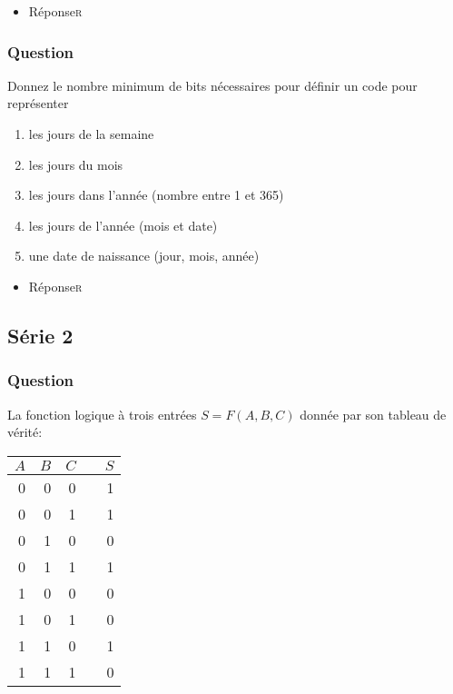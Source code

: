 \documentclass[11pt]{article}
\begin{document}
\begin{itemize}
\item Réponse\hfill{}\textsc{r}
\label{sec:orge75a3d5}
\end{itemize}

\subsubsection*{Question}
\label{sec:org6382b1a}
Donnez le nombre minimum de bits nécessaires pour définir un code pour représenter

\begin{enumerate}
\item les jours de la semaine

\item les jours du mois

\item les jours dans l'année (nombre entre 1 et 365)

\item les jours de l'année (mois et date)

\item une date de naissance (jour, mois, année)
\end{enumerate}

\begin{itemize}
\item Réponse\hfill{}\textsc{r}
\label{sec:org11f1cb2}
\end{itemize}

\subsection*{Série 2}
\label{sec:org5712613}
\subsubsection*{Question}
\label{sec:org60bb7f0}
La fonction logique à trois entrées \(S = F(A,B,C)\) donnée par son 
   tableau de vérité:
\begin{center}
\begin{tabular}{rrrlr}
\(A\) & \(B\) & \(C\) &  & \(S\)\\
\hline
0 & 0 & 0 &  & 1\\
0 & 0 & 1 &  & 1\\
0 & 1 & 0 &  & 0\\
0 & 1 & 1 &  & 1\\
1 & 0 & 0 &  & 0\\
1 & 0 & 1 &  & 0\\
1 & 1 & 0 &  & 1\\
1 & 1 & 1 &  & 0\\
\end{tabular}
\end{center}
\end{document}
